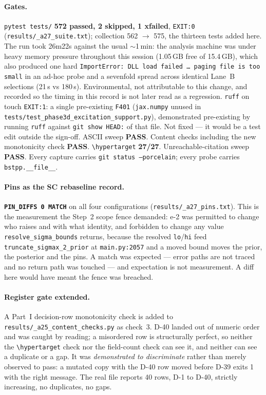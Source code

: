 \documentclass[
  10pt,
]{article}
\begin{document}
\paragraph{Gates.}
\texttt{pytest tests/} \textbf{572 passed, 2 skipped, 1 xfailed}, \texttt{EXIT:0} (\texttt{results/\allowbreak{}\_a27\_suite.txt}); collection 562 $\rightarrow$ 575, the thirteen tests added here. The run took 26m22s against the usual $\sim$1\,min: the analysis machine was under heavy memory pressure throughout this session (1.05\,GB free of 15.4\,GB), which also produced one hard \texttt{ImportError: DLL load failed \ldots{} paging file is too small} in an ad-hoc probe and a sevenfold spread across identical Lane~B selections (21\,s vs 180\,s). Environmental, not attributable to this change, and recorded so the timing in this record is not later read as a regression. \texttt{ruff} on touch \texttt{EXIT:1}: a single pre-existing \texttt{F401} (\texttt{jax.numpy} unused in \texttt{tests/test\_phase3d\_excitation\_support.py}), demonstrated pre-existing by running \texttt{ruff} against \texttt{git show HEAD:} of that file. Not fixed --- it would be a test edit outside the sign-off. ASCII sweep \textbf{PASS}. Content checks including the new monotonicity check \textbf{PASS}. \texttt{\textbackslash hypertarget} \textbf{27/27}. Unreachable-citation sweep \textbf{PASS}. Every capture carries \texttt{git status --porcelain}; every probe carries \texttt{bstpp.\_\_file\_\_}.

\paragraph{Pins as the SC rebaseline record.}
\textbf{\texttt{PIN\_DIFFS 0 MATCH}} on all four configurations (\texttt{results/\allowbreak{}\_a27\_pins.txt}). This is the measurement the Step~2 scope fence demanded: e-2 was permitted to change who raises and with what identity, and forbidden to change any value \texttt{resolve\_sigma\_bounds} returns, because the resolved \texttt{lo}/\texttt{hi} feed \texttt{truncate\_sigmax\_2\_prior} at \texttt{main.py:2057} and a moved bound moves the prior, the posterior and the pins. A match was expected --- error paths are not traced and no return path was touched --- and expectation is not measurement. A diff here would have meant the fence was breached.

\paragraph{Register gate extended.}
A Part~I decision-row monotonicity check is added to \texttt{results/\allowbreak{}\_a25\_content\_checks.py} as check~3. D-40 landed out of numeric order and was caught by reading; a misordered row is structurally perfect, so neither the \texttt{\textbackslash hypertarget} check nor the field-count check can see it, and neither can see a duplicate or a gap. It was \emph{demonstrated to discriminate} rather than merely observed to pass: a mutated copy with the D-40 row moved before D-39 exits 1 with the right message. The real file reports 40 rows, D-1 to D-40, strictly increasing, no duplicates, no gaps.
\end{document}
